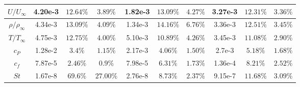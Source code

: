 \documentclass[journal ]{new-aiaa}
\begin{document}
\begin{table}
\begin{tabular}{|c|c|c|c|c|c|c|c|c|c|}
\textbf{$U/U_{\infty}$}    & 4.20e-3 & $12.64\%$ & $3.89\%$  & 1.82e-3 & $13.09\%$ & $4.27\%$ & 3.27e-3 & $12.31\%$ & $3.36\%$ \\ \hline
\textbf{$\rho/\rho_{\infty}$} & 4.34e-3 & $13.09\%$ & $4.09\%$  & 1.34e-3 & $14.16\%$ & $6.76\%$ & 3.36e-3 & $12.51\%$ & $3.45\%$ \\ \hline
\textbf{$T/T_{\infty}$}    & 4.75e-3 & $12.75\%$ & $4.00\%$  & 5.10e-3 & $10.89\%$ & $4.26\%$ & 3.45e-3 & $11.08\%$ & $2.90\%$ \\ \hline
\textbf{$c_P$}  & 1.28e-2 & $3.4\%$  & $1.15\%$  & 2.17e-3 & $4.06\%$  & $1.50\%$ & 2.7e-3  & $5.18\%$  & $1.68\%$ \\ \hline
\textbf{$c_f$}  & 7.87e-5 & $2.46\%$  & $0.9\%$  & 7.98e-5 & $6.31\%$  & $1.73\%$ & 1.36e-4 & $8.21\%$  & $2.52\%$ \\ \hline
\textbf{$St$}   & 1.67e-8 & $69.6\%$  & $27.00\%$ & 2.76e-8 & $8.73\%$  & $2.37\%$ & 9.15e-7 & $11.68\%$ & $3.09\%$ \\ \hline
\end{tabular}
\end{table}


\end{document}
